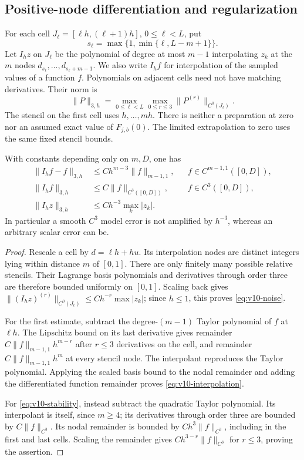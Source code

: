 \subsection{Positive-node differentiation and regularization}
For each cell $J_\ell=[\ell h,(\ell+1)h]$, $0\le\ell<L$, put
\[
 s_\ell=\max\{1,\min\{\ell,L-m+1\}\}.
\]
Let $I_hz$ on $J_\ell$ be the polynomial of degree at most $m-1$
interpolating $z_k$ at the $m$ nodes
$d_{s_\ell},\ldots,d_{s_\ell+m-1}$. We also write $I_hf$ for
interpolation of the sampled values of a function $f$. Polynomials
on adjacent cells need not have matching derivatives. Their norm is
\[
 \|P\|_{3,h}=\max_{0\le\ell<L}\max_{0\le r\le3}
                         \|P^{(r)}\|_{C^0(J_\ell)}.
\]
The stencil on the first cell uses $h,\ldots,mh$. There is neither
a preparation at zero nor an assumed exact value of $F_{j,b}(0)$.
The limited extrapolation to zero uses the same fixed stencil bounds.

\begin{lemma}\label{lem:v10-stencils}
With constants depending only on $m,D$, one has
\begin{align}
 \|I_h f-f\|_{3,h}&\le C h^{m-3}\|f\|_{m-1,1},
                   &&f\in C^{m-1,1}([0,D]),\label{eq:v10-interpolation}\\
 \|I_h f\|_{3,h}&\le C\|f\|_{C^3([0,D])},
                   &&f\in C^3([0,D]),\label{eq:v10-stability}\\
 \|I_h z\|_{3,h}&\le C h^{-3}\max_k|z_k|.
                                      \label{eq:v10-noise}
\end{align}
In particular a smooth $C^3$ model error is not amplified by
$h^{-3}$, whereas an arbitrary scalar error can be.
\end{lemma}
\begin{proof}
Rescale a cell by $d=\ell h+hu$. Its interpolation nodes are distinct
integers lying within distance $m$ of $[0,1]$. There are only finitely
many possible relative stencils. Their Lagrange basis polynomials
and derivatives through order three are therefore bounded uniformly
on $[0,1]$. Scaling back gives
$\|(I_hz)^{(r)}\|_{C^0(J_\ell)}\le C h^{-r}\max|z_k|$;
since $h\le1$, this proves \eqref{eq:v10-noise}.

For the first estimate, subtract the degree-$(m-1)$ Taylor polynomial
of $f$ at $\ell h$. The Lipschitz bound on its last derivative gives
remainder $C\|f\|_{m-1,1}h^{m-r}$ after $r\le3$ derivatives
on the cell, and remainder $C\|f\|_{m-1,1}h^m$ at every stencil
node. The interpolant reproduces the Taylor polynomial. Applying the
scaled basis bound to the nodal remainder and adding the differentiated
function remainder proves \eqref{eq:v10-interpolation}.

For \eqref{eq:v10-stability}, instead subtract the quadratic Taylor
polynomial. Its interpolant is itself, since $m\ge4$; its derivatives
through order three are bounded by $C\|f\|_{C^3}$. Its nodal
remainder is bounded by $C h^3\|f\|_{C^3}$, including in the first
and last cells. Scaling the remainder gives
$C h^{3-r}\|f\|_{C^3}$ for $r\le3$, proving the assertion.
\end{proof}


